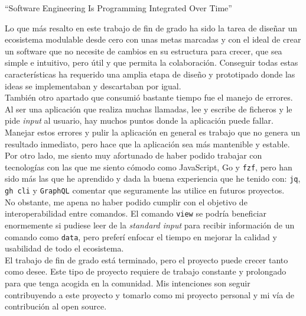 ``Software Engineering Is Programming Integrated Over Time'' \label{conclusion}

\bigskip
Lo que más resalto en este trabajo de fin de grado ha sido la tarea de diseñar un ecosistema modulable desde cero con unas metas marcadas y con el ideal de crear un software que no necesite de cambios en su estructura para crecer, que sea simple e intuitivo, pero útil y que permita la colaboración. Conseguir todas estas características ha requerido una amplia etapa de diseño y prototipado donde las ideas se implementaban y descartaban por igual.\\
También otro apartado que consumió bastante tiempo fue el manejo de errores. Al ser una aplicación que realiza muchas llamadas, lee y escribe de ficheros y le pide \emph{input} al usuario, hay muchos puntos donde la aplicación puede fallar. Manejar estos errores y pulir la aplicación en general es trabajo que no genera un resultado inmediato, pero hace que la aplicación sea más mantenible y estable.\\
Por otro lado, me siento muy afortunado de haber podido trabajar con tecnologías con las que me siento cómodo como JavaScript, Go y \verb|fzf|, pero han sido más las que he aprendido y dada la buena experiencia que he tenido con: \verb|jq|, \verb|gh cli| y \verb|GraphQL| comentar que seguramente las utilice en futuros proyectos.\\
No obstante, me apena no haber podido cumplir con el objetivo de interoperabilidad entre comandos. El comando \verb|view| se podría beneficiar enormemente si pudiese leer de la \emph{standard input} para recibir información de un comando como \verb|data|, pero preferí enfocar el tiempo en mejorar la calidad y usabilidad de todo el ecosistema.\\
El trabajo de fin de grado está terminado, pero el proyecto puede crecer tanto como desee. Este tipo de proyecto requiere de trabajo constante y prolongado para que tenga acogida en la comunidad. Mis intenciones son seguir contribuyendo a este proyecto y tomarlo como mi proyecto personal y mi vía de contribución al open source.